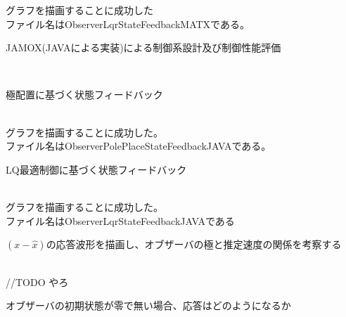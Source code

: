 \documentclass{jarticle}
\begin{document}
\begin{enumerate}
\begin{enumerate}
\begin{enumerate}
					グラフを描画することに成功した\\
					ファイル名はObserverLqrStateFeedbackMATXである。\\
								
			\end{enumerate}
			{\Large\item JAMOX(JAVAによる実装)による制御系設計及び制御性能評価}\\
			\begin{enumerate}
				{\large\item 極配置に基づく状態フィードバック}\\
								
					グラフを描画することに成功した。\\
					ファイル名はObserverPolePlaceStateFeedbackJAVAである。\\
								
				{\large\item LQ最適制御に基づく状態フィードバック}\\
								
					グラフを描画することに成功した。\\
					ファイル名はObserverLqrStateFeedbackJAVAである\\
								
			\end{enumerate}
			{\Large\item $(x-\widehat{x})$の応答波形を描画し、オブザーバの極と推定速度の関係を考察する}\\
							
					//TODO やろ
								
			{\Large\item オブザーバの初期状態が零で無い場合、応答はどのようになるか}\\
							

\end{enumerate}
\end{enumerate}
\end{document}

